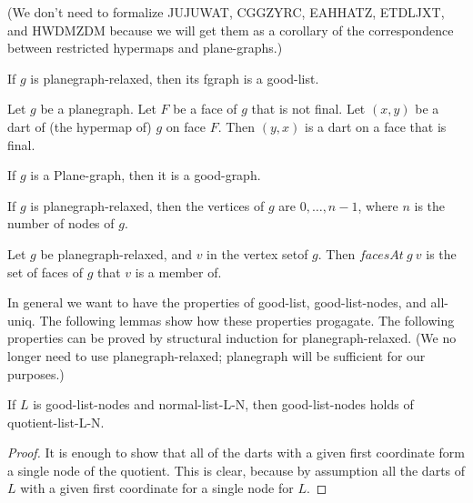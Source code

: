 (We don't need to formalize JUJUWAT, CGGZYRC, EAHHATZ, ETDLJXT, and HWDMZDM
 because we will get them as a corollary
of the correspondence between restricted hypermaps and plane-graphs.)

\begin{lemma} 
If $g$ is planegraph-relaxed, then its fgraph is a good-list.
\end{lemma}  

\begin{lemma} 
Let $g$ be a planegraph.  Let $F$ be a face of $g$
that is not final.  Let $(x,y)$ be a dart of (the hypermap of) $g$ on face
$F$.
Then $(y,x)$ is a dart on a face that is final.
\end{lemma} 
 
\begin{lemma}
If $g$ is a Plane-graph, then it is a good-graph.
\end{lemma}

\begin{lemma}
If $g$ is planegraph-relaxed, then  the vertices of $g$ are $0,\ldots,n-1$, where
$n$ is the number of nodes of $g$. 
\end{lemma} 

\begin{lemma}
Let $g$ be planegraph-relaxed, and $v$ in the vertex setof $g$.
Then $facesAt~g~v$ is the set of faces of $g$ that $v$ is a member of.
\end{lemma}


In general we want to have the properties of good-list, good-list-nodes, and all-uniq.
The following lemmas show how these properties progagate.
The following properties can be proved by structural induction
for planegraph-relaxed.  (We no longer need to use planegraph-relaxed; planegraph will
be sufficient for our purposes.)



\begin{lemma}  If $L$ is good-list-nodes and normal-list-L-N, then good-list-nodes
 holds of quotient-list-L-N.
\end{lemma}

\begin{proof}  It is enough to show that all of the darts with a given first coordinate form a single node of the quotient.
This is clear, because by assumption all the darts of $L$ with a given first coordinate for a single node for $L$.
\end{proof}

